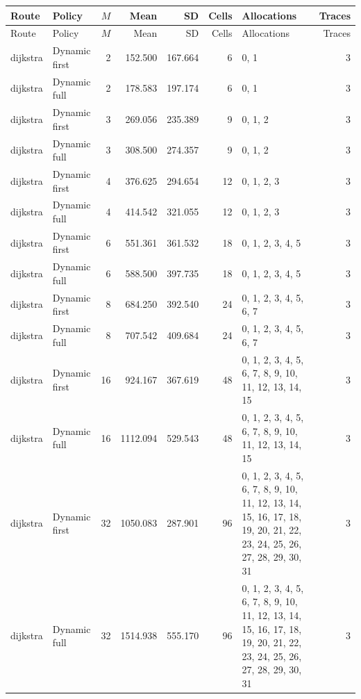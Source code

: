 \documentclass[10pt,a4paper]{article}
\begin{document}
\tiny\setlength{\tabcolsep}{2pt}\begin{longtable}{@{}p{23mm}p{29mm}rrrrp{36mm}r@{}}
\toprule Route & Policy & $M$ & Mean & SD & Cells & Allocations & Traces \\ \midrule\endfirsthead
\toprule Route & Policy & $M$ & Mean & SD & Cells & Allocations & Traces \\ \midrule\endhead
\bottomrule\endfoot
dijkstra & Dynamic first & 2 & 152.500 & 167.664 & 6 & 0, 1 & 3 \\
dijkstra & Dynamic full & 2 & 178.583 & 197.174 & 6 & 0, 1 & 3 \\
dijkstra & Dynamic first & 3 & 269.056 & 235.389 & 9 & 0, 1, 2 & 3 \\
dijkstra & Dynamic full & 3 & 308.500 & 274.357 & 9 & 0, 1, 2 & 3 \\
dijkstra & Dynamic first & 4 & 376.625 & 294.654 & 12 & 0, 1, 2, 3 & 3 \\
dijkstra & Dynamic full & 4 & 414.542 & 321.055 & 12 & 0, 1, 2, 3 & 3 \\
dijkstra & Dynamic first & 6 & 551.361 & 361.532 & 18 & 0, 1, 2, 3, 4, 5 & 3 \\
dijkstra & Dynamic full & 6 & 588.500 & 397.735 & 18 & 0, 1, 2, 3, 4, 5 & 3 \\
dijkstra & Dynamic first & 8 & 684.250 & 392.540 & 24 & 0, 1, 2, 3, 4, 5, 6, 7 & 3 \\
dijkstra & Dynamic full & 8 & 707.542 & 409.684 & 24 & 0, 1, 2, 3, 4, 5, 6, 7 & 3 \\
dijkstra & Dynamic first & 16 & 924.167 & 367.619 & 48 & 0, 1, 2, 3, 4, 5, 6, 7, 8, 9, 10, 11, 12, 13, 14, 15 & 3 \\
dijkstra & Dynamic full & 16 & 1112.094 & 529.543 & 48 & 0, 1, 2, 3, 4, 5, 6, 7, 8, 9, 10, 11, 12, 13, 14, 15 & 3 \\
dijkstra & Dynamic first & 32 & 1050.083 & 287.901 & 96 & 0, 1, 2, 3, 4, 5, 6, 7, 8, 9, 10, 11, 12, 13, 14, 15, 16, 17, 18, 19, 20, 21, 22, 23, 24, 25, 26, 27, 28, 29, 30, 31 & 3 \\
dijkstra & Dynamic full & 32 & 1514.938 & 555.170 & 96 & 0, 1, 2, 3, 4, 5, 6, 7, 8, 9, 10, 11, 12, 13, 14, 15, 16, 17, 18, 19, 20, 21, 22, 23, 24, 25, 26, 27, 28, 29, 30, 31 & 3 \\
\end{longtable}\normalsize\setlength{\tabcolsep}{6pt}
\clearpage
\end{document}
